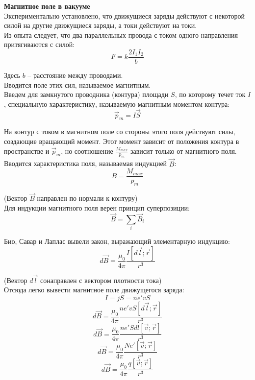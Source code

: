 \documentclass{article}
\begin{document}
	
	\textbf{Магнитное поле в вакууме}\\

	Экспериментально установлено, что движущиеся заряды действуют с некоторой силой на другие движущиеся заряды, а токи действуют на токи.\\

	Из опыта следует, что два параллельных провода с током одного направления притягиваются с силой:
	\begin{equation}
		F = k\frac{2I_1I_2}{b}
	\end{equation}

	Здесь $b$ -- расстояние между проводами. \\

	Вводится поле этих сил, называемое магнитным.\\

	Введем для замкнутого проводника (контура) площади $S$, по которому течет ток $I$, специальную характеристику, называемую магнитным моментом контура:
	\begin{equation}
		\vec p_m = I\vec S
	\end{equation} 

	На контур с током в магнитном поле со стороны этого поля действуют силы, создающие вращающий момент. Этот момент зависит от положения контура в пространстве и $\vec p_m$, но соотношение $\frac{M_{max}}{p_m}$ зависит только от магнитного поля. Вводится характеристика поля, называемая индукцией $\vec B$:
	\begin{equation}
		B = \frac{M_{max}}{p_m}
	\end{equation}

	(Вектор $\vec B$ направлен по нормали к контуру)\\

	Для индукции магнитного поля верен принцип суперпозиции:
	\begin{equation}
		\vec B = \sum_i \vec B_i
	\end{equation}

	Био, Савар и Лаплас вывели закон, выражающий элементарную индукцию:
	\begin{equation}
		d\vec B = \frac{\mu_0}{4\pi}\frac{I[d\vec l;\vec r]}{r^3}
	\end{equation}

	(Вектор $d\vec l$ сонаправлен с вектором плотности тока)\\

	Отсюда легко вывести магнитное поле движущегося заряда:
	\begin{equation}
		I = jS = ne'vS
	\end{equation}
	\begin{equation}
		d\vec B = \frac{\mu_0}{4\pi}\frac{ne'vS[d\vec l;\vec r]}{r^3}
	\end{equation}
	\begin{equation}
		d\vec B = \frac{\mu_0}{4\pi}\frac{ne'Sdl[\vec v;\vec r]}{r^3}
	\end{equation}
	\begin{equation}
		d\vec B = \frac{\mu_0}{4\pi}\frac{Ne'[\vec v;\vec r]}{r^3}
	\end{equation}
	\begin{equation}
		d\vec B = \frac{\mu_0}{4\pi}\frac{q[\vec v;\vec r]}{r^3}
	\end{equation}
\end{document}
